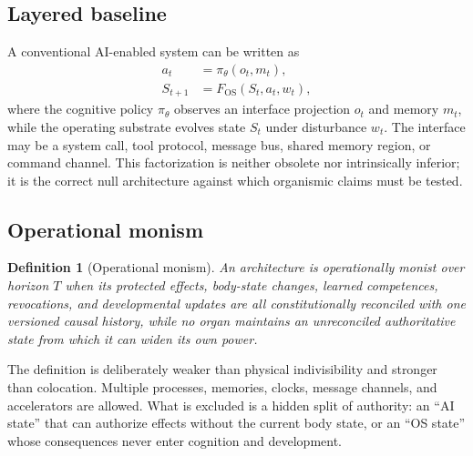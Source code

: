 \documentclass[journal,10pt]{IEEEtran}
\newtheorem{definition}{Definition}
\begin{document}
\subsection{Layered baseline}
A conventional AI-enabled system can be written as
\begin{align}
  a_t &= \pi_\theta(o_t,m_t), \label{eq:layered_policy}\\
  S_{t+1} &= F_{\mathrm{OS}}(S_t,a_t,w_t), \label{eq:layered_os}
\end{align}
where the cognitive policy $\pi_\theta$ observes an interface projection $o_t$ and memory $m_t$, while the operating substrate evolves state $S_t$ under disturbance $w_t$. The interface may be a system call, tool protocol, message bus, shared memory region, or command channel. This factorization is neither obsolete nor intrinsically inferior; it is the correct null architecture against which organismic claims must be tested.

\subsection{Operational monism}
\begin{definition}[Operational monism]
An architecture is operationally monist over horizon $T$ when its protected effects, body-state changes, learned competences, revocations, and developmental updates are all constitutionally reconciled with one versioned causal history, while no organ maintains an unreconciled authoritative state from which it can widen its own power.
\end{definition}

The definition is deliberately weaker than physical indivisibility and stronger than colocation. Multiple processes, memories, clocks, message channels, and accelerators are allowed. What is excluded is a hidden split of authority: an ``AI state'' that can authorize effects without the current body state, or an ``OS state'' whose consequences never enter cognition and development.
\end{document}
